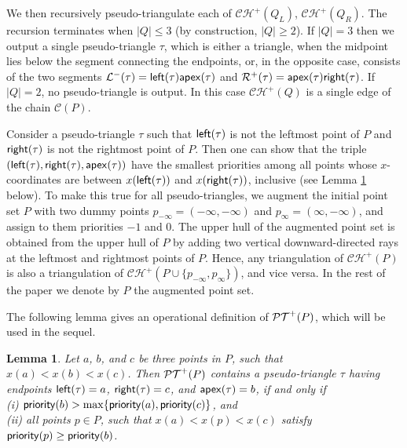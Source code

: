\documentclass[11pt]{article}
\def\CH{{\mathcal{CH}}}
\def\PT{{\cal PT}}
\def\prior{{\sf priority}}
\def\C{\mathcal{C}}
\def\L{{\cal L}}
\def\R{\mathcal{R}}
\def\Left{{\sf left}}
\def\Right{{\sf right}}
\def\apex{{\sf apex}}
\newtheorem{lemma}[theorem]{Lemma}
\begin{document}
We then recursively pseudo-triangulate
each of $\CH^+(Q_L)$, $\CH^+(Q_R)$. The recursion
terminates when $|Q|\leq 3$ (by construction, $|Q|\geq 2$). If $|Q|=3$ then we output a single pseudo-triangle $\tau$, which is either a triangle,
when the midpoint lies below the segment connecting the endpoints, or, in the opposite case,
consists of the two segments $\L^-(\tau)=\Left(\tau)\apex(\tau)$ and
$\R^+(\tau)=\apex(\tau)\Right(\tau)$. If $|Q|=2$, no pseudo-triangle is output. In this case $\CH^+(Q)$ is a single edge of the chain $\C(P)$. 


Consider a pseudo-triangle $\tau$ such that 
$\Left(\tau)$ is not the leftmost point of $P$ and 
$\Right(\tau)$ is not the rightmost point of $P$.
Then one can show that the triple 
$(\Left(\tau),\Right(\tau),\apex(\tau))$ have the smallest priorities
among all points whose $x$-coordinates are between $x(\Left(\tau))$
and $x(\Right(\tau))$, inclusive (see Lemma \ref{Lemma:ConditionPseudo} below). To make this true for all 
pseudo-triangles, we
 augment the initial point set $P$ with two dummy points
$p_{-\infty}=(-\infty,-\infty)$ and $p_{\infty}=(\infty,-\infty)$, and
assign to them priorities $-1$ and $0$.
The upper hull of the augmented point set is
obtained from the upper hull of $P$ by adding two vertical downward-directed rays at the leftmost and rightmost points of $P$. Hence, any triangulation of $\CH^+(P)$ is also a triangulation of $\CH^+(P\cup\{p_{-\infty},p_{\infty}\})$, and vice versa.
In the rest of the paper we denote by $P$ the augmented point
set. 

The following lemma gives an operational definition of
$\PT^+(P)$, which will be used in the sequel.

\begin{lemma}\label{Lemma:ConditionPseudo}
  Let $a$, $b$, and $c$ be three points in $P$, such that
  $x(a)<x(b)<x(c)$. Then $\PT^+(P)$ contains a pseudo-triangle
  $\tau$ having endpoints $\Left(\tau)=a$, $\Right(\tau)=c$, and
  $\apex(\tau)=b$, if and only if\\ (i)
  $\prior(b)>\max\{\prior(a),\prior(c)\}$, and\\ 
  (ii) all points $p\in
  P$, such that $x(a)<x(p)<x(c)$ satisfy $\prior(p)\geq \prior(b)$.
\end{lemma}
\end{document}
